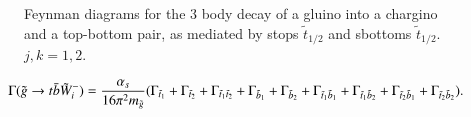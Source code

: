 \documentclass[final,3p,times]{elsarticle}
\begin{document}
\begin{figure}
  \caption{Feynman diagrams for the 3 body decay of a gluino into a chargino and a top-bottom pair, as mediated by stops $\tilde{t}_{1/2}$ and sbottoms $\tilde{t}_{1/2}$. $j,k=1,2$.} \label{gcharqqpdiag}
\end{figure} 
\begin{equation} \label{gchqqp}
\Gamma(\tilde{g} \rightarrow t \bar{b} \tilde{W}_i^-) = {\alpha_s \over 16 \pi^2 m_{\tilde{g}}} (\Gamma_{\tilde{t}_1} + \Gamma_{\tilde{t}_2} + \Gamma_{\tilde{t}_1 \tilde{t}_2} + \Gamma_{\tilde{b}_1} + \Gamma_{\tilde{b}_2} + \Gamma_{\tilde{t}_1 \tilde{b}_1} + \Gamma_{\tilde{t}_1 \tilde{b}_2} + \Gamma_{\tilde{t}_2 \tilde{b}_1} + \Gamma_{\tilde{t}_2 \tilde{b}_2}).
\end{equation}
\end{document}
